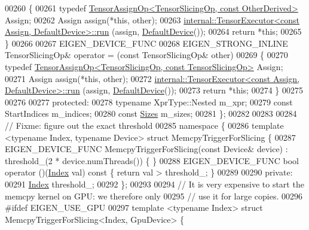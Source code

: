 \begin{DoxyCode}
00260     \{
00261       \textcolor{keyword}{typedef} \hyperlink{class_eigen_1_1_tensor_assign_op}{TensorAssignOp<TensorSlicingOp, const OtherDerived>}
       Assign;
00262       Assign assign(*\textcolor{keyword}{this}, other);
00263       \hyperlink{class_eigen_1_1internal_1_1_tensor_executor}{internal::TensorExecutor<const Assign, DefaultDevice>::run}
      (assign, \hyperlink{struct_eigen_1_1_default_device}{DefaultDevice}());
00264       \textcolor{keywordflow}{return} *\textcolor{keyword}{this};
00265     \}
00266 
00267     EIGEN\_DEVICE\_FUNC
00268     EIGEN\_STRONG\_INLINE TensorSlicingOp& operator = (\textcolor{keyword}{const} TensorSlicingOp& other)
00269     \{
00270       \textcolor{keyword}{typedef} \hyperlink{class_eigen_1_1_tensor_assign_op}{TensorAssignOp<TensorSlicingOp, const TensorSlicingOp>}
       Assign;
00271       Assign assign(*\textcolor{keyword}{this}, other);
00272       \hyperlink{class_eigen_1_1internal_1_1_tensor_executor}{internal::TensorExecutor<const Assign, DefaultDevice>::run}
      (assign, \hyperlink{struct_eigen_1_1_default_device}{DefaultDevice}());
00273       \textcolor{keywordflow}{return} *\textcolor{keyword}{this};
00274     \}
00275 
00276 
00277   \textcolor{keyword}{protected}:
00278     \textcolor{keyword}{typename} XprType::Nested m\_xpr;
00279     \textcolor{keyword}{const} StartIndices m\_indices;
00280     \textcolor{keyword}{const} \hyperlink{struct_eigen_1_1_sizes}{Sizes} m\_sizes;
00281 \};
00282 
00283 
00284 \textcolor{comment}{// Fixme: figure out the exact threshold}
00285 \textcolor{keyword}{namespace }\{
00286 \textcolor{keyword}{template} <\textcolor{keyword}{typename} Index, \textcolor{keyword}{typename} Device> \textcolor{keyword}{struct }MemcpyTriggerForSlicing \{
00287   EIGEN\_DEVICE\_FUNC MemcpyTriggerForSlicing(\textcolor{keyword}{const} Device& device) : threshold\_(2 * device.numThreads()) \{ \}
00288   EIGEN\_DEVICE\_FUNC \textcolor{keywordtype}{bool} operator ()(\hyperlink{namespace_eigen_a62e77e0933482dafde8fe197d9a2cfde}{Index} val)\textcolor{keyword}{ const }\{ \textcolor{keywordflow}{return} val > threshold\_; \}
00289 
00290  \textcolor{keyword}{private}:
00291   \hyperlink{namespace_eigen_a62e77e0933482dafde8fe197d9a2cfde}{Index} threshold\_;
00292 \};
00293 
00294 \textcolor{comment}{// It is very expensive to start the memcpy kernel on GPU: we therefore only}
00295 \textcolor{comment}{// use it for large copies.}
00296 \textcolor{preprocessor}{#ifdef EIGEN\_USE\_GPU}
00297 \textcolor{keyword}{template} <\textcolor{keyword}{typename} Index> \textcolor{keyword}{struct }MemcpyTriggerForSlicing<Index, GpuDevice>  \{

\end{DoxyCode}
